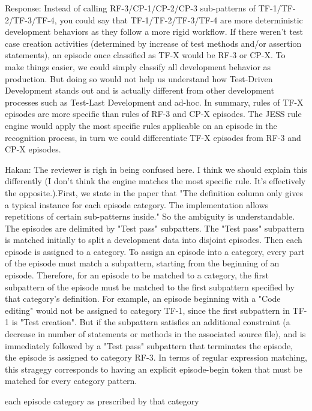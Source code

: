 \documentclass[11pt]{article}
\begin{document}
\noindent Response: Instead of calling RF-3/CP-1/CP-2/CP-3 sub-patterns of
TF-1/TF-2/TF-3/TF-4, you could say that TF-1/TF-2/TF-3/TF-4 are more  deterministic development behaviors as they follow a more rigid workflow.
If there weren't test case creation activities (determined by increase of test methods and/or assertion statements), an episode once classified as TF-X would be RF-3 or CP-X. To make things easier, we could simply classify all development
behavior as production. But doing so would not help us understand how Test-Driven Development stands out and is actually different from other development processes such as Test-Last Development and ad-hoc. In summary,  rules of TF-X episodes are more specific than rules of RF-3 and CP-X episodes. The JESS rule engine would apply the most specific rules applicable on an episode in the recognition process, in turn we could differentiate TF-X episodes from RF-3 and CP-X episodes.

\noindent Hakan:  The reviewer is righ in being confused here. I think we should explain this differently (I don't think the engine matches the most specific rule. It's effectively the opposite.).First, we state in the paper that "The definition column only gives a typical instance for each episode category. The implementation allows repetitions of certain sub-patterns inside." So the ambiguity is understandable. The episodes are delimited by "Test pass" subpatters. The "Test pass" subpattern is matched initially to split a development data into disjoint episodes. Then each episode is assigned to a category. To assign an episode into a category, every part of the episode must match a subpattern, starting from the beginning of an episode. Therefore, for an episode to be matched to a category, the first subpattern of the episode must be matched to the first subpattern specified by that category's definition. For example, an episode beginning with a "Code editing" would not be assigned to category TF-1, since the first subpattern in TF-1 is "Test creation". But if the subpattern satisfies an additional constraint (a decrease in number of statements or methods in the associated source file), and is immediately followed by a "Test pass" subpattern that terminates the episode, the episode is assigned to category RF-3. In terms of regular expression matching, this stragegy corresponds to having an explicit episode-begin token that must be matched for every category pattern. 

each episode category as prescribed by that category
\end{document}
